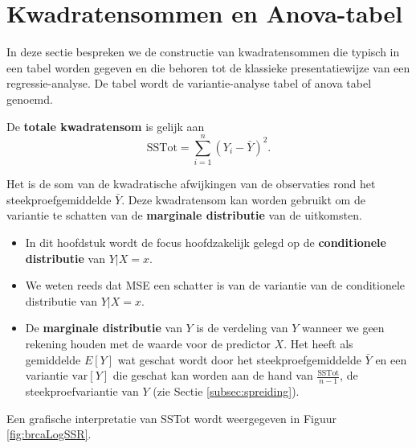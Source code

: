 \documentclass[12pt,dutch,coursenotes]{book}
\providecommand{\tightlist}{%
  \setlength{\itemsep}{0pt}\setlength{\parskip}{0pt}}
\theoremstyle{definition}
\theoremstyle{definition}
\theoremstyle{definition}
\theoremstyle{remark}
\begin{document}
\section{Kwadratensommen en Anova-tabel}\label{sec:linAnova}

In deze sectie bespreken we de constructie van kwadratensommen die
typisch in een tabel worden gegeven en die behoren tot de klassieke
presentatiewijze van een regressie-analyse. De tabel wordt de
variantie-analyse tabel of anova tabel genoemd.

De \textbf{totale kwadratensom} is gelijk aan
\[\text{SSTot} = \sum_{i=1}^n (Y_i-\bar{Y})^2.\]

Het is de som van de kwadratische afwijkingen van de observaties rond
het steekproefgemiddelde \(\bar Y\). Deze kwadratensom kan worden
gebruikt om de variantie te schatten van de \textbf{marginale
distributie} van de uitkomsten.

\begin{itemize}
\tightlist
\item
  In dit hoofdstuk wordt de focus hoofdzakelijk gelegd op de
  \textbf{conditionele distributie} van \(Y\vert X=x\).
\item
  We weten reeds dat MSE een schatter is van de variantie van de
  conditionele distributie van \(Y\vert X=x\).
\item
  De \textbf{marginale distributie} van \(Y\) is de verdeling van \(Y\)
  wanneer we geen rekening houden met de waarde voor de predictor \(X\).
  Het heeft als gemiddelde \(E[Y]\) wat geschat wordt door het
  steekproefgemiddelde \(\bar{Y}\) en een variantie \(\text{var}[Y]\)
  die geschat kan worden aan de hand van \(\frac{\text{SSTot}}{n-1}\),
  de steekproefvariantie van \(Y\) (zie Sectie \ref{subsec:spreiding}).
\end{itemize}

Een grafische interpretatie van SSTot wordt weergegeven in Figuur
\ref{fig:brcaLogSSR}.
\end{document}
